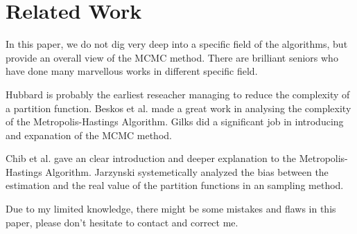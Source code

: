 
\section{Related Work} \label{sec:relatedwork}

In this paper, we do not dig very deep into a specific field of the algorithms, but provide an overall view of the MCMC method.
There are brilliant seniors who have done many marvellous works in different specific field.

Hubbard\cite{hubbard1959calculation} is probably the earliest reseacher managing to reduce the complexity of a partition function. Beskos et al.\cite{beskos2009} made a great work in analysing the complexity of the Metropolis-Hastings Algorithm. Gilks\cite{gilks2005markov} did a significant job in introducing and expanation of the MCMC method.

Chib et al.\cite{chib1995} gave an clear introduction and deeper explanation to the Metropolis-Hastings Algorithm. Jarzynski\cite{nonequilibrium} systemetically analyzed the bias between the estimation and the real value of the partition functions in an sampling method.

Due to my limited knowledge, there might be some mistakes and flaws in this paper, please don't hesitate to contact and correct me.